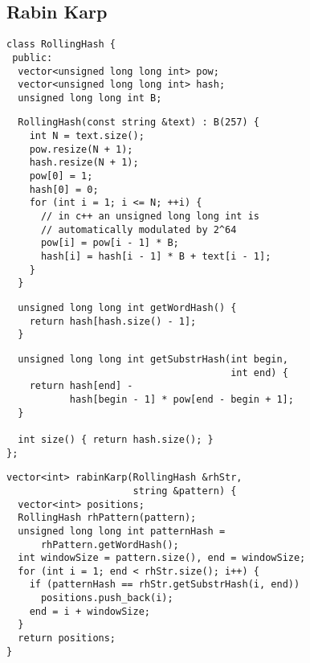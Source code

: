 \documentclass[twoside]{article}
\begin{document}
\begin{multicols*}{2}
\subsectionfont{\large\bfseries\sffamily\underline}
\subsection*{Rabin Karp}
\begin{verbatim}
class RollingHash {
 public:
  vector<unsigned long long int> pow;
  vector<unsigned long long int> hash;
  unsigned long long int B;
\end{verbatim}
\vspace{-12pt}
\begin{verbatim}
  RollingHash(const string &text) : B(257) {
    int N = text.size();
    pow.resize(N + 1);
    hash.resize(N + 1);
    pow[0] = 1;
    hash[0] = 0;
    for (int i = 1; i <= N; ++i) {
      // in c++ an unsigned long long int is
      // automatically modulated by 2^64
      pow[i] = pow[i - 1] * B;
      hash[i] = hash[i - 1] * B + text[i - 1];
    }
  }
\end{verbatim}
\vspace{-12pt}
\begin{verbatim}
  unsigned long long int getWordHash() {
    return hash[hash.size() - 1];
  }
\end{verbatim}
\vspace{-12pt}
\begin{verbatim}
  unsigned long long int getSubstrHash(int begin,
                                       int end) {
    return hash[end] -
           hash[begin - 1] * pow[end - begin + 1];
  }

  int size() { return hash.size(); }
};
\end{verbatim}
\vspace{-12pt}
\begin{verbatim}
vector<int> rabinKarp(RollingHash &rhStr,
                      string &pattern) {
  vector<int> positions;
  RollingHash rhPattern(pattern);
  unsigned long long int patternHash =
      rhPattern.getWordHash();
  int windowSize = pattern.size(), end = windowSize;
  for (int i = 1; end < rhStr.size(); i++) {
    if (patternHash == rhStr.getSubstrHash(i, end))
      positions.push_back(i);
    end = i + windowSize;
  }
  return positions;
}
\end{verbatim}

\sectionfont{\bfseries\sffamily\centering\Huge}
\vspace{1em}

\end{multicols*}
\end{document}
